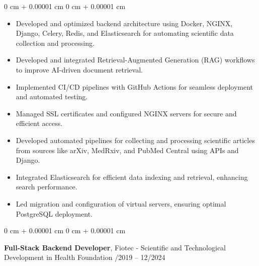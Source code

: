 \documentclass[10pt, letterpaper]{article}
\newenvironment{highlights}{
    \begin{itemize}[
        topsep=0.10 cm,
        parsep=0.10 cm,
        partopsep=0pt,
        itemsep=0pt,
        leftmargin=0 cm + 10pt
    ]
}{
    \end{itemize}
} %
\newenvironment{onecolentry}{
    \begin{adjustwidth}{
        0 cm + 0.00001 cm
    }{
        0 cm + 0.00001 cm
    }
}{
    \end{adjustwidth}
} %
\newenvironment{twocolentry}[2][]{
    \onecolentry
    \def\secondColumn{#2}
    \setcolumnwidth{\fill, 4.5 cm}
    \begin{paracol}{2}
}{
    \switchcolumn \raggedleft \secondColumn
    \end{paracol}
    \endonecolentry
} %
\begin{document}
        \vspace{0.10 cm}
        \begin{onecolentry}
            \begin{highlights}
                \item Developed and optimized backend architecture using Docker, NGINX, Django, Celery, Redis, and Elasticsearch for automating scientific data collection and processing. \\
                \item Developed and integrated Retrieval-Augmented Generation (RAG) workflows to improve AI-driven document retrieval.\\
                \item Implemented CI/CD pipelines with GitHub Actions for seamless deployment and automated testing. \\
                \item Managed SSL certificates and configured NGINX servers for secure and efficient access. \\
                \item Developed automated pipelines for collecting and processing scientific articles from sources like arXiv, MedRxiv, and PubMed Central using APIs and Django. \\
                \item Integrated Elasticsearch for efficient data indexing and retrieval, enhancing search performance. \\
                \item Led migration and configuration of virtual servers, ensuring optimal PostgreSQL deployment. \\
            \end{highlights}
        \end{onecolentry}

        \vspace{0.2 cm}

        \begin{twocolentry}{
            03/2019 -- 12/2024
        }
            \textbf{Full-Stack \band Backend Developer}, Fiotec - Scientific and Technological Development in Health Foundation\end{twocolentry}
\end{document}
